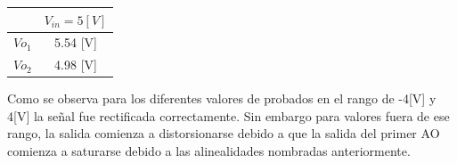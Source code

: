 \begin{center}
	\begin{tabular}{| c | c |}
		\hline
		& $V_{in}= 5[V]$ \\ \hline
		$Vo_1$ 	&  	5.54 [V] 	 \\
		$Vo_2$ 	& 	4.98 [V]	 \\ \hline
	\end{tabular}
\end{center}
Como se observa para los diferentes valores de probados en el rango de -4[V] y 4[V] la señal fue rectificada correctamente. Sin embargo para valores fuera de ese rango, la salida comienza a distorsionarse debido a que la salida del primer AO comienza a saturarse debido a las alinealidades nombradas anteriormente.
